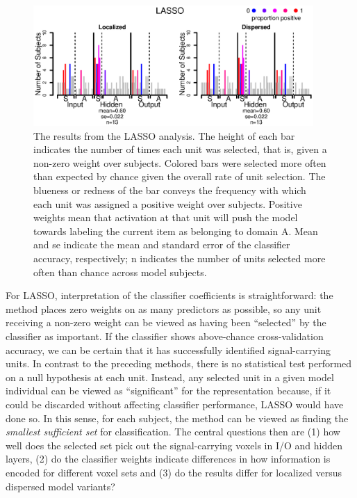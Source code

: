 \begin{figure}
\centering
\includegraphics[width=0.95\textwidth]{figures/lasso_only.eps}
\caption{The results from the LASSO analysis. The height of each bar indicates the number of times each unit was selected, that is, given a non-zero weight over subjects. Colored bars were selected more often than expected by chance given the overall rate of unit selection. The blueness or redness of the bar conveys the frequency with which each unit was assigned a positive weight over subjects. Positive weights mean that activation at that unit will push the model towards labeling the current item as belonging to domain A. Mean and se indicate the mean and standard error of the classifier accuracy, respectively; n indicates the number of units selected more often than chance across model subjects.}
\label{fig.lasso} 
\end{figure}

For LASSO, interpretation of the classifier coefficients is straightforward: the method places zero weights on as many predictors as possible, so any unit receiving a non-zero weight can be viewed as having been ``selected'' by the classifier as important. If the classifier shows above-chance cross-validation accuracy, we can be certain that it has successfully identified signal-carrying units. In contrast to the preceding methods, there is no statistical test performed on a null hypothesis at each unit. Instead, any selected unit in a given model individual can be viewed as ``significant'' for the representation because, if it could be discarded without affecting classifier performance, LASSO would have done so. In this sense, for each subject, the method can be viewed as finding the {\em smallest sufficient set} for classification. The central questions then are (1) how well does the selected set pick out the signal-carrying voxels in I/O and hidden layers, (2) do the classifier weights indicate differences in how information is encoded for different voxel sets and (3) do the results differ for localized versus dispersed model variants?

